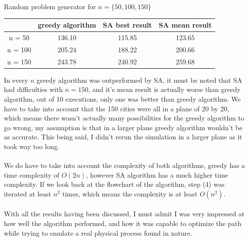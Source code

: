\documentclass[a4paper]{article}
\begin{document}
\begin{center}
Random problem generator for $n = \{50, 100, 150\}$\\
\begin{tabular}{|c|c|c|c|}
\hline
        &  greedy algorithm &  SA best result &  SA mean result \\ \hline
 n = 50  &  136.10           &  115.85        &  123.65        \\ \hline
 n = 100 &  205.24           &  188.22    &  200.66         \\ \hline
 n = 150 &  243.78          &     240.92           &  259.68         \\ \hline
\end{tabular}
\end{center}
In every $n$ greedy algorithm was outperformed by SA, it must be noted that SA had difficulties with $n = 150$, and it's mean result is actually worse than greedy algorithm, out of 10 executions, only one was better than greedy algorithm. We have to take into account that the 150 cities were all in a plane of 20 by 20, which means there wasn't actually many possibilities for the greedy algorithm to go wrong, my assumption is that in a larger plane greedy algorithm wouldn't be as accurate. This being said, I didn't rerun the simulation in a larger plane as it took way too long.\\\\
We do have to take into account the complexity of both algorithms, greedy has a time complexity of $O(2n)$, however SA algorithm has a much higher time complexity. If we look back at the flowchart of the algorithm, step (4) was iterated at least $n^{2}$ times, which means the complexity is at least $O(n^{2})$.\\\\
With all the results having been discussed, I must admit I was very impressed at how well the algorithm performed, and how it was capable to optimize the path while trying to emulate a real physical process found in nature.
\end{document}

